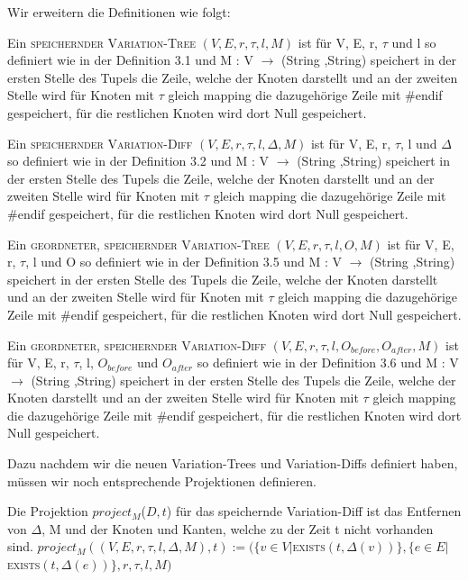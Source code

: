 Wir erweitern die Definitionen wie folgt:
\begin{definition}
	Ein \textsc{speichernder Variation-Tree} $(V,E,r,\tau,l,M) $ ist für V, E, r, $\tau$ und l so definiert wie in der Definition 3.1 und M : V $\rightarrow$ (String ,String) speichert in der ersten Stelle des Tupels die Zeile, welche der Knoten darstellt und an der zweiten Stelle wird für Knoten mit $\tau$ gleich mapping die dazugehörige Zeile mit \#endif gespeichert, für die restlichen Knoten wird dort Null gespeichert.
\end{definition}
\begin{definition}
	Ein \textsc{speichernder Variation-Diff} $(V,E,r,\tau,l,\Delta,M) $ ist für V, E, r, $\tau$, l und $\Delta$ so definiert wie in der Definition 3.2 und M : V $\rightarrow$ (String ,String) speichert in der ersten Stelle des Tupels die Zeile, welche der Knoten darstellt und an der zweiten Stelle wird für Knoten mit $\tau$ gleich mapping die dazugehörige Zeile mit \#endif gespeichert, für die restlichen Knoten wird dort Null gespeichert.
\end{definition}
\begin{definition}
	Ein \textsc{geordneter, speichernder Variation-Tree} $(V,E,r,\tau,l,O,M) $ ist für V, E, r, $\tau$, l und O so definiert wie in der Definition 3.5 und M : V $\rightarrow$ (String ,String) speichert in der ersten Stelle des Tupels die Zeile, welche der Knoten darstellt und an der zweiten Stelle wird für Knoten mit $\tau$ gleich mapping die dazugehörige Zeile mit \#endif gespeichert, für die restlichen Knoten wird dort Null gespeichert.
\end{definition}
\begin{definition}
	Ein \textsc{geordneter, speichernder Variation-Diff} $(V,E,r,\tau,l,O_{before},O_{after},M) $ ist für V, E, r, $\tau$, l, $O_{before}$ und $O_{after}$ so definiert wie in der Definition 3.6 und M : V $\rightarrow$ (String ,String) speichert in der ersten Stelle des Tupels die Zeile, welche der Knoten darstellt und an der zweiten Stelle wird für Knoten mit $\tau$ gleich mapping die dazugehörige Zeile mit \#endif gespeichert, für die restlichen Knoten wird dort Null gespeichert.
\end{definition}
Dazu nachdem wir die neuen Variation-Trees und Variation-Diffs definiert haben, müssen wir noch entsprechende Projektionen definieren.
\begin{definition}
	Die Projektion $project_{M}$($D,t$) für das speichernde Variation-Diff ist das Entfernen von $\Delta$, M und der Knoten und Kanten, welche zu der Zeit t nicht vorhanden sind. $project_{M}$$((V,E,r,\tau,l,\Delta,M),t) := (\{v \in V | $\textsc{exists}$(t,\Delta(v))\},\{e \in E | $\textsc{exists}$(t,\Delta(e))\},r,\tau,l,M)$
\end{definition}
